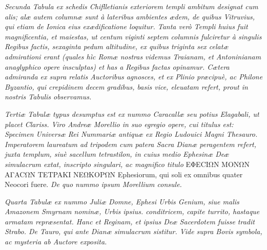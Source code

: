 \documentclass[a4paper, 11pt, oneside, polutonikogreek, latin]{article}
\begin{document}
\emph{Secunda Tabula ex schedis Chiflletianis exteriorem templi ambitum designat cum alis; alæ autem columnæ sunt à lateribus ambientes ædem, de quibus Vitruvius, qui etiam de Ionica eius exædificatione loquitur. Tanta verò Templi huius fuit magnificentia, et maiestas, ut centum viginti septem columnis fulciretur à singulis Regibus factis, sexaginta pedum altitudine, ex quibus triginta sex celatæ admirationi erant (quales hìc Romæ nostras videmus Traianam, et Antoninianam anaglyphico opere insculptas) et has a Regibus factas opinamur. Cætera admiranda ex supra relatis Auctoribus agnosces, et ex Plinio præcipuè, ac Philone Byzantio, qui crepidinem decem gradibus, basis vice, eleuatam refert, prout in nostris Tabulis observamus.}

\emph{Tertiæ Tabulæ typus desumptus est ex nummo Caracallæ seu potius Elagabali, ut placet Clariss. Viro Andreæ Morellio in suo egregio opere, cui titulus est: Specimen Universæ Rei Nummariæ antiquæ ex Regio Ludouici Magni Thesauro. Imperatorem laureatum ad tripodem cum patera Sacra Dianæ peragentem refert, juxta templum, siuè sacellum tetrastilon, in cuius medio Ephesinæ Deæ simulacrum extat, inscripto singulari, ac magnifico titulo} EΦECIΩN MONΩN AΓACΩN TETPAKI NEΩKOPΩN Ephesiorum, qui soli ex omnibus quater Neocori fuere. \emph{De quo nummo ipsum Morellium consule.}

\emph{Quarta Tabulæ ex nummo Juliæ Domne, Ephesi Urbis Genium, siue malis Amazonem Smyrnam nominæ, Urbis ipsius. conditricem, capite turrito, hastaque armatam repræsentat. Hanc et Reginam, et ipsius Deæ Sacerdotem fuisse tradit Strabo. De Tauro, qui ante Dianæ simulacrum sistitur. Vide supra Bovis symbola, ac mysteria ab Auctore exposita.}
\end{document}
